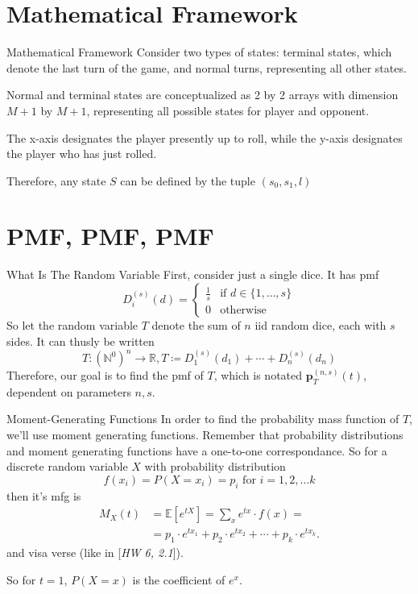 \documentclass{beamer}
\begin{document}
\section{Mathematical Framework}
\begin{frame}{Mathematical Framework}
    Consider two types of states: terminal states, which denote the last turn of the game, and normal turns, representing all other states. 

    Normal and terminal states are conceptualized as 2 by 2 arrays with dimension $M+1$ by $M+1$, representing all possible states for player and opponent.
    
    The x-axis designates the player presently up to roll, while the y-axis designates the player who has just rolled.

    Therefore, any state $S$ can be defined by the tuple $(s_0, s_1, l)$
\end{frame}

\section{PMF, PMF, PMF}
\begin{frame}{What Is The Random Variable}
    First, consider just a single dice. It has pmf
    $$
    D_{i}^{(s)}(d) = \begin{cases}
        \frac{1}{s} & \text{if } d \in \{1, \ldots, s \} \\
        0 & \text{otherwise}
    \end{cases}
    $$
    So let the random variable $T$ denote the sum of $n$ iid random dice, each with $s$ sides. It can thusly be written
    $$ 
    T: \left(\mathbb{N}^{0}\right)^n \to \mathbb{R}, T \coloneqq D_{1}^{(s)}(d_1) + \cdots + D_{n}^{(s)}(d_n) 
    $$
    Therefore, our goal is to find the pmf of $T$, which is notated $\textbf{p}_{T}^{(n, s)}(t)$, dependent on parameters $n, s$. 
\end{frame}

\begin{frame}{Moment-Generating Functions}
    In order to find the probability mass function of $T$, we'll use moment generating functions. Remember that probability distributions and moment generating functions have a one-to-one correspondance. So for a discrete random variable $X$ with probability distribution
    $$ 
    f(x_i) = P(X = x_i) = p_i \text{ for } i = 1, 2, \ldots k 
    $$
    then it's mfg is
    \begin{align*}
        M_X(t) &= \mathbb{E}[e^{tX}] = \sum_{x} e^{tx} \cdot f(x) =  \\ 
        &= p_1 \cdot e^{tx_1} + p_2 \cdot e^{tx_2} + \cdots + p_k \cdot e^{tx_k}.
    \end{align*}
    and visa verse (like in [\textit{HW 6, 2.1}]).

    So for $t = 1$, $P(X = x)$ is the coefficient of $e^x$. 
\end{frame}
\end{document}
